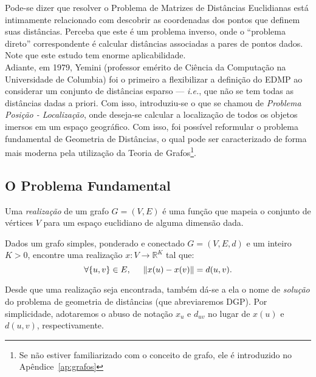 Pode-se dizer que resolver o Problema de Matrizes de Distâncias Euclidianas está intimamente relacionado com descobrir as coordenadas dos pontos que definem suas distâncias. Perceba que este é um problema inverso, onde o ``problema direto'' correspondente é calcular distâncias associadas a pares de pontos dados. Note que este estudo tem enorme aplicabilidade.
\\

Adiante, em 1979, Yemini (professor emérito de Ciência da Computação na Universidade de Columbia) foi o primeiro a flexibilizar a definição do EDMP ao considerar um conjunto de distâncias esparso \cite{Yemini:79} --- \textit{i.e.}, que não se tem todas as distâncias dadas a priori. Com isso, introduziu-se o que se chamou de \textit{Problema Posição - Localização}, onde deseja-se calcular a localização de todos os objetos imersos em um espaço geográfico. 
Com isso, foi possível reformular o problema fundamental de Geometria de Distâncias, o qual pode ser caracterizado de forma mais moderna pela utilização da Teoria de Grafos\footnote{Se não estiver familiarizado com o conceito de grafo, ele é introduzido no Apêndice~\ref{ap:grafos}}.

\subsection{O Problema Fundamental}

\begin{definicao}[Realização]
	Uma \emph{realização} de um grafo $G = (V,E)$ é uma função que mapeia o conjunto de vértices $V$ para um espaço euclidiano de alguma dimensão dada.
\end{definicao}

\begin{definicao}
	Dados um grafo simples, ponderado e conectado $G = (V, E, d)$ e um inteiro $K>0$, encontre uma realização $x: V \longrightarrow \mathbb{R}^K$ tal que:
	\begin{equation}
		\forall \{u,v\} \in E, \hspace{0.5cm} \lVert x(u) - x(v) \rVert = d(u,v). \label{eq:DGP}
	\end{equation}	
\end{definicao}

Desde que uma realização seja encontrada, também dá-se a ela o nome de \textit{solução} do problema de geometria de distâncias (que abreviaremos DGP). Por simplicidade, adotaremos o abuso de notação $x_u$ e $d_{uv}$ no lugar de $x(u)$ e $d(u,v)$, respectivamente.
\\

